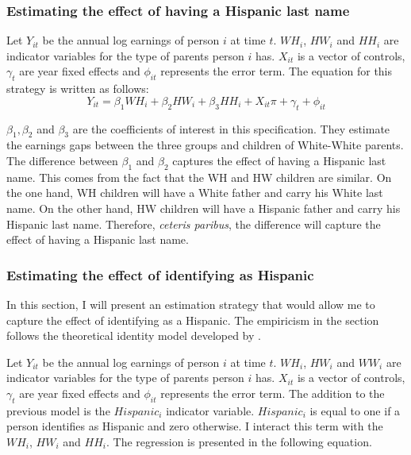 \documentclass[12pt, fullpage]{article}
\begin{document}
\subsubsection{Estimating the effect of having a Hispanic last name}

Let $Y_{it}$ be the annual log earnings of person $i$ at time $t$. $WH_{i}$, $HW_{i}$ and $HH_{i}$ are indicator variables for the type of parents person $i$ has. $X_{it}$ is a vector of controls, $\gamma_{t}$ are year fixed effects and $\phi_{it}$ represents the error term. The equation for this strategy is written as follows:
\begin{equation} \label{eq:1a}
Y_{it} = \beta_{1} WH_{i} +\beta_{2} HW_{i} + \beta_{3} HH_{i} + X_{it} \pi + \gamma_{t}+\phi_{it}
\end{equation}

$\beta_{1}, \beta_{2}$ and $\beta_{3}$ are the coefficients of interest in this specification. They estimate the earnings gaps between the three groups and children of White-White parents. The difference between $\beta_{1}$ and $\beta_{2}$ captures the effect of having a Hispanic last name. This comes from the fact that the WH and HW children are similar. On the one hand, WH children will have a White father and carry his White last name. On the other hand, HW children will have a Hispanic father and carry his Hispanic last name. Therefore, \textit{ceteris paribus}, the difference will capture the effect of having a Hispanic last name.


\subsubsection{Estimating the effect of identifying as Hispanic}

In this section, I will present an estimation strategy that would allow me to capture the effect of identifying as a Hispanic. The empiricism in the section follows the theoretical identity model developed by \citet{akerlof2000economics}. 

Let $Y_{it}$ be the annual log earnings of person $i$ at time $t$. $WH_{i}$, $HW_{i}$ and $WW_{i}$ are indicator variables for the type of parents person $i$ has. $X_{it}$ is a vector of controls, $\gamma_{t}$ are year fixed effects and $\phi_{it}$ represents the error term. The addition to the previous model is the $Hispanic_{i}$ indicator variable. $Hispanic_{i}$ is equal to one if a person identifies as Hispanic and zero otherwise. I interact this term with the $WH_{i}$, $HW_{i}$ and $HH_{i}$.  The regression is presented in the following equation.
\end{document}
